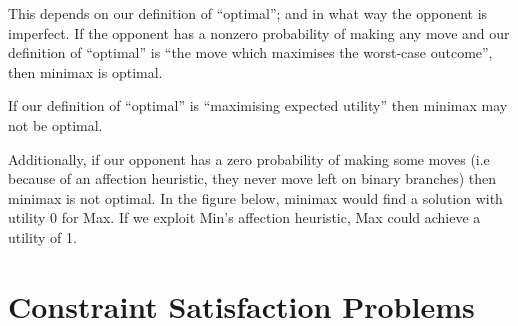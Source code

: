 \documentclass[10pt,\jkfside,a4paper]{article}
\begin{document}
\begin{enumerate}
This depends on our definition of ``optimal''; and in what way the opponent
is imperfect. If the opponent has a nonzero probability of making any move
and our definition of ``optimal'' is ``the move which maximises the
worst-case outcome'', then minimax is optimal.

If our definition of ``optimal'' is ``maximising expected utility'' then
minimax may not be optimal.

Additionally, if our opponent has a zero probability of making some moves (i.e
because of an affection heuristic, they never move left on binary branches)
then minimax is not optimal. In the figure below, minimax would find a
solution with utility 0 for Max. If we exploit Min's affection heuristic,
Max could achieve a utility of 1.

\begin{figure}[H]
\centering
{}
\end{figure}

\end{enumerate}

\section{Constraint Satisfaction Problems}
\end{document}
